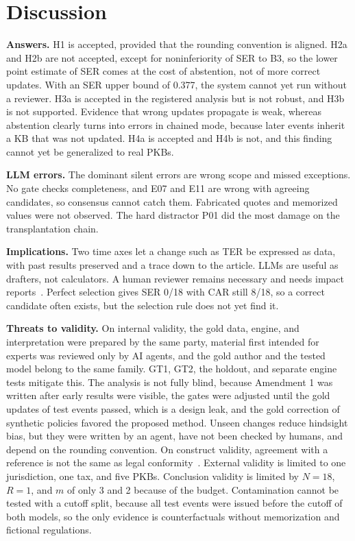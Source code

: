 \documentclass[conference]{IEEEtran}
\begin{document}
\section{Discussion}
\label{sec:pembahasan}
\textbf{Answers.} H1 is accepted, provided that the rounding convention is aligned. H2a and H2b are not accepted, except for noninferiority of SER to B3, so the lower point estimate of SER comes at the cost of abstention, not of more correct updates. With an SER upper bound of 0.377, the system cannot yet run without a reviewer. H3a is accepted in the registered analysis but is not robust, and H3b is not supported. Evidence that wrong updates propagate is weak, whereas abstention clearly turns into errors in chained mode, because later events inherit a KB that was not updated. H4a is accepted and H4b is not, and this finding cannot yet be generalized to real PKBs.

\textbf{LLM errors.} The dominant silent errors are wrong scope and missed exceptions. No gate checks completeness, and E07 and E11 are wrong with agreeing candidates, so consensus cannot catch them. Fabricated quotes and memorized values were not observed. The hard distractor P01 did the most damage on the transplantation chain.

\textbf{Implications.} Two time axes let a change such as TER be expressed as data, with past results preserved and a trace down to the article. LLMs are useful as drafters, not calculators. A human reviewer remains necessary and needs impact reports~\cite{enqvist2023oversight}. Perfect selection gives SER 0/18 with CAR still 8/18, so a correct candidate often exists, but the selection rule does not yet find it.

\textbf{Threats to validity.} On internal validity, the gold data, engine, and interpretation were prepared by the same party, material first intended for experts was reviewed only by AI agents, and the gold author and the tested model belong to the same family. GT1, GT2, the holdout, and separate engine tests mitigate this. The analysis is not fully blind, because Amendment 1 was written after early results were visible, the gates were adjusted until the gold updates of test events passed, which is a design leak, and the gold correction of synthetic policies favored the proposed method. Unseen changes reduce hindsight bias, but they were written by an agent, have not been checked by humans, and depend on the rounding convention. On construct validity, agreement with a reference is not the same as legal conformity~\cite{witt2024encoding}. External validity is limited to one jurisdiction, one tax, and five PKBs. Conclusion validity is limited by $N = 18$, $R = 1$, and $m$ of only 3 and 2 because of the budget. Contamination cannot be tested with a cutoff split, because all test events were issued before the cutoff of both models, so the only evidence is counterfactuals without memorization and fictional regulations.
\end{document}
